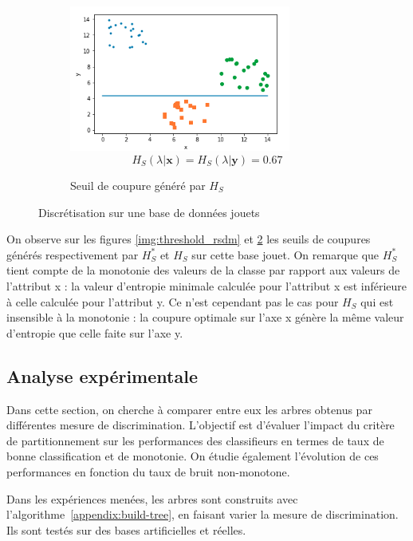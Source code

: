 \documentclass[a4paper]{article}
\newcommand{\algoref}[1]{algorithme~\ref{#1}}
\begin{document}
\begin{figure}[H]
\begin{subfigure}[c]{0.46\textwidth}
        \centering
	    \includegraphics[width=0.8\textwidth]{images/threshold_sdm.png}
        $$H_S(\lambda | \mathbf{x}) = H_S(\lambda | \mathbf{y}) =  0.67$$
        \caption{Seuil de coupure généré par $H_S$}
        \label{img:threshold_sdm}
    \end{subfigure}
\caption{Discrétisation sur une base de données jouets}
\end{figure}

On observe sur les figures \ref{img:threshold_rsdm} et \ref{img:threshold_sdm}
les seuils de coupures générés respectivement par $H^*_S$ et $H_S$ sur cette
base jouet. On remarque que $H^*_S$ tient compte de la monotonie des valeurs de
la classe par rapport aux valeurs de l'attribut x : la valeur d'entropie
minimale calculée pour l'attribut x est inférieure à celle calculée pour
l'attribut y. Ce n'est cependant pas le cas pour $H_S$ qui est insensible à la
monotonie : la coupure optimale sur l'axe x génère la même valeur d'entropie que
celle faite sur l'axe y.

\subsection{Analyse expérimentale} 

Dans cette section, on cherche à comparer entre eux les arbres obtenus par
différentes mesure de discrimination.
L'objectif est d'évaluer l'impact du critère de partitionnement sur les
performances des classifieurs en termes de taux de bonne classification et de
monotonie. On étudie également l'évolution de ces performances en fonction du
taux de bruit non-monotone. 

Dans les expériences menées, les arbres sont construits avec
l'\algoref{appendix:build-tree}, en faisant varier la mesure de discrimination.
Ils sont testés sur des bases artificielles et réelles. 
\end{document}
